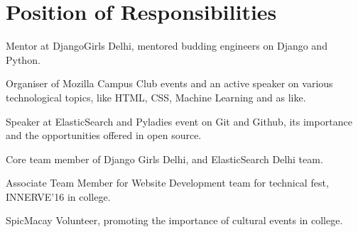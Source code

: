 \documentclass[]{hieudo-build}
\begin{document}
\begin{minipage}[t]{0.69\textwidth}
\section{Position of Responsibilities}

\vspace{0.5em} 
\begin{tightemize}
\item Mentor at DjangoGirls Delhi, mentored budding engineers on Django and Python.
\item Organiser of Mozilla Campus Club events and an active speaker on various technological topics, like HTML, CSS, Machine Learning and as like.
\item Speaker at ElasticSearch and Pyladies event on Git and Github, its importance and the opportunities offered in open source.
\item Core team member of Django Girls Delhi, and ElasticSearch Delhi team.
\item Associate Team Member for Website Development team for technical fest, INNERVE'16 in college.
\item SpicMacay Volunteer, promoting the importance of cultural events in college.
\end{tightemize}
\sectionsep


\end{minipage} 
\end{document}
